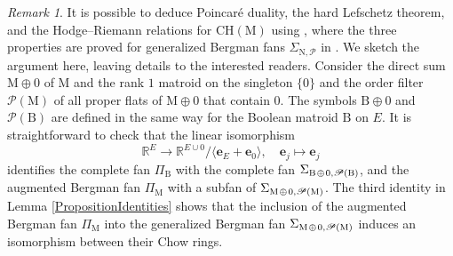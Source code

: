 \documentclass[11pt,reqno]{amsart}
\theoremstyle{definition}
\theoremstyle{remark}
\newtheorem{remark}[theorem]{Remark}
\renewcommand{\(}{\left(}
\renewcommand{\)}{\right)}
\newcommand{\<}{\left<}
\renewcommand{\>}{\right>}
\begin{document}
\begin{remark}\label{RemarkAlternative}
It is possible to deduce Poincar\'e duality, the hard Lefschetz theorem, and the Hodge--Riemann relations for $\mathrm{CH}(\mathrm{M})$  using  \cite[Theorem 6.19 and Theorem 8.8]{AHK},
where the three properties are proved for generalized Bergman fans 
$\Sigma_{\mathrm{N},\mathscr{P}}$  in \cite[Definition 3.2]{AHK}. %
We sketch the argument here, leaving details to the interested readers.
Consider  the direct sum $\mathrm{M} \oplus 0$ of $\mathrm{M}$ and the rank $1$ matroid on  the singleton $\{0\}$ and the order filter  $\mathscr{P}(\mathrm{M})$ of all proper flats of $\mathrm{M} \oplus 0$ that contain $0$.
The symbols  $\mathrm{B}\oplus 0$ and $\mathscr{P}(\mathrm{B})$ are defined in the same way for the Boolean matroid $\mathrm{B}$ on $E$.
It is straightforward to check that the linear isomorphism
\[
\mathbb{R}^E \longrightarrow \mathbb{R}^{E \cup 0}/\langle \mathbf{e}_{E}+\mathbf{e}_0\rangle, \quad \mathbf{e}_j \longmapsto \mathbf{e}_j %
\]
identifies the complete fan $\Pi_\mathrm{B}$ with the complete fan $\Sigma_{\mathrm{B} \hspace{0.3mm}\oplus  \hspace{0.3mm}0, \mathscr{P}(\mathrm{B})}$,
and the augmented Bergman fan $\Pi_\mathrm{M}$ with a subfan of $\Sigma_{\mathrm{M} \hspace{0.3mm}\oplus  \hspace{0.3mm} 0,\mathscr{P}(\mathrm{M})}$. %
The third identity in Lemma \ref{PropositionIdentities} shows that
the inclusion of the augmented Bergman fan $\Pi_\mathrm{M}$ into the generalized Bergman fan $\Sigma_{\mathrm{M} \hspace{0.3mm}\oplus  \hspace{0.3mm} 0,\mathscr{P}(\mathrm{M})}$ induces an isomorphism between their Chow rings.
 \end{remark}
\end{document}
